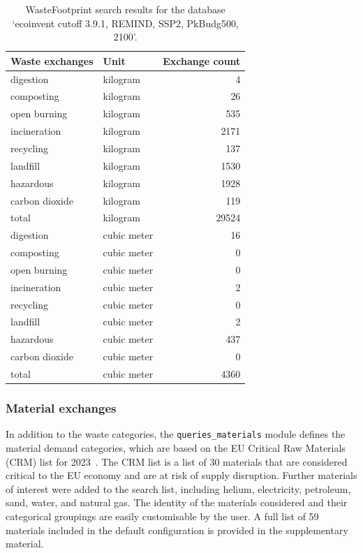 \begin{table}[ht]
    \centering
    \caption{WasteFootprint search results for the database `ecoinvent cutoff 3.9.1, REMIND, SSP2, PkBudg500, 2100'.}\label{tab:wf_results}
    \begin{tabular}{llr}
        \toprule
        \textbf{Waste exchanges} & \textbf{Unit} & \textbf{Exchange count} \\
        \midrule
        digestion & kilogram & 4 \\
        composting & kilogram & 26 \\
        open burning & kilogram & 535 \\
        incineration & kilogram & 2171 \\
        recycling & kilogram & 137 \\
        landfill & kilogram & 1530 \\
        hazardous & kilogram & 1928 \\
        carbon dioxide & kilogram & 119 \\
        total & kilogram & 29524 \\
        digestion & cubic meter & 16 \\
        composting & cubic meter & 0 \\
        open burning & cubic meter & 0 \\
        incineration & cubic meter & 2 \\
        recycling & cubic meter & 0 \\
        landfill & cubic meter & 2 \\
        hazardous & cubic meter & 437 \\
        carbon dioxide & cubic meter & 0 \\
        total & cubic meter & 4360 \\
        \bottomrule
\end{tabular}
\end{table}

\subsubsection{Material exchanges}\label{sec:method-wmf-material_exchanges}
In addition to the waste categories, the \texttt{queries\_materials} module defines the material demand categories, which are based on the EU Critical Raw Materials (CRM) list for 2023~\citep{eu2023crmstudy}. The CRM list is a list of 30 materials that are considered critical to the EU economy and are at risk of supply disruption. Further materials of interest were added to the search list, including helium, electricity, petroleum, sand, water, and natural gas. The identity of the materials considered and their categorical groupings are easily customisable by the user. A full list of 59 materials included in the default configuration is provided in the supplementary material.

